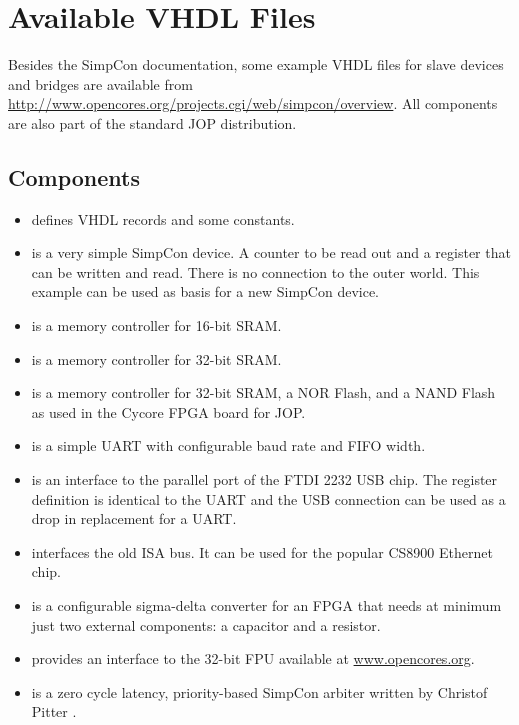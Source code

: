 \section{Available VHDL Files}

Besides the SimpCon documentation, some example VHDL files for slave
devices and bridges are available from
\url{http://www.opencores.org/projects.cgi/web/simpcon/overview}. All
components are also part of the standard JOP distribution.


\subsection{Components}

\begin{itemize}
    \item {} defines VHDL records and some
    constants.
    \item {} is a very simple SimpCon device. A
    counter to be read out and a register that can be written and
    read. There is no connection to the outer world. This example
    can be used as basis for a new SimpCon device.
    \item {} is a memory controller for 16-bit
    SRAM.
    \item {} is a memory controller for 32-bit
    SRAM.
    \item {} is a memory controller for 32-bit
    SRAM, a NOR Flash, and a NAND Flash as used in the Cycore FPGA board for JOP.
    \item {} is a simple UART with configurable
    baud rate and FIFO width.
    \item {} is an interface to the parallel port of
    the FTDI 2232 USB chip. The register definition is identical to
    the UART and the USB connection can be used as a drop in
    replacement for a UART.
    \item {} interfaces the old ISA bus. It can be used
    for the popular CS8900 Ethernet chip.
    \item {} is a configurable sigma-delta converter
    for an FPGA that needs at minimum just two external components:
    a capacitor and a resistor.
    \item {} provides an interface to the 32-bit FPU available
    at \url{www.opencores.org}.
    \item {} is a zero cycle latency,
        priority-based SimpCon arbiter written by Christof Pitter
        \cite{jop:cmp}.
\end{itemize}

